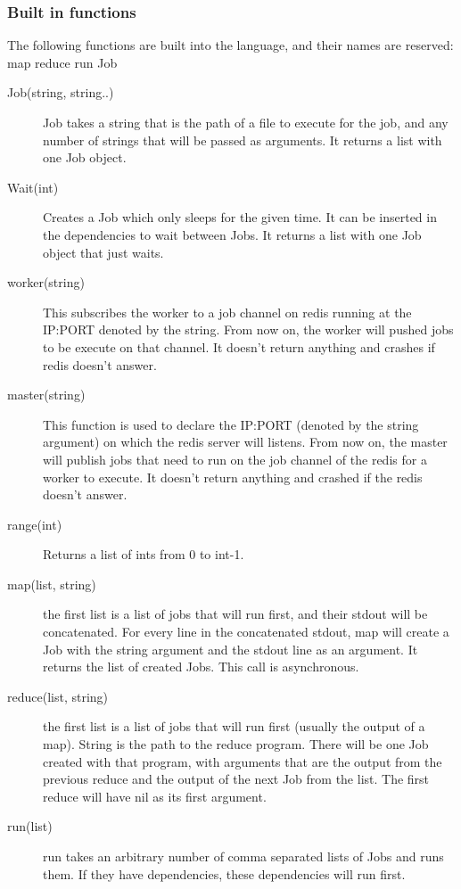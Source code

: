 \subsubsection{Built in functions}
The following functions are built into the language, and their names are reserved:\\
map reduce run Job\\
\begin{description}
  \item[Job(string, string..)] Job takes a string that is the path of a file to
    execute for the job, and any number of strings that will be passed as
    arguments. It returns a list with one Job object.
  \item[Wait(int)] Creates a Job which only sleeps for the given time. It can be inserted
  in the dependencies to wait between Jobs. It returns a list with one Job object that just
  waits.
  \item[worker(string)] This subscribes the worker to a job channel on redis running at
    the IP:PORT denoted by the string. From now on, the worker will pushed jobs to
    be execute on that channel. It doesn't return anything and crashes if redis doesn't
    answer.
  \item[master(string)] This function is used to declare
    the IP:PORT (denoted by the string argument) on which the redis server will listens.
    From now on, the master will publish jobs that need to run on the job channel of the redis
    for a worker to execute. It doesn't return anything and crashed if the redis doesn't
    answer.
  \item[range(int)] Returns a list of ints from 0 to int-1.
  \item[map(list, string)] the first list is a list of jobs that will run first, and their
    stdout will be concatenated. For every line in the concatenated stdout, map will create
    a Job with the string argument and the stdout line as an argument. It returns the list
    of created Jobs. This call is asynchronous.
  \item[reduce(list, string)] the first list is a list of jobs that will run first (usually the
    output of a map). String is the path to the reduce program. There will be one Job
    created with that program, with arguments that are the output from the previous reduce and
    the output of the next Job from the list. The first reduce will have nil as its first argument.
  \item[run(list)] run takes an arbitrary number of comma separated lists of Jobs
    and runs them. If they have dependencies, these dependencies will run first.
\end{description}

